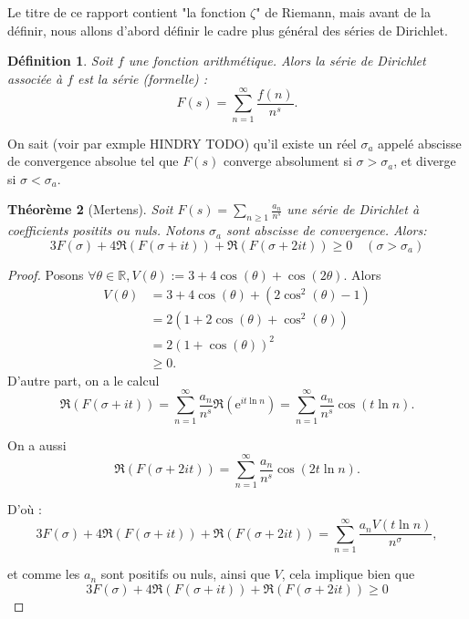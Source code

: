 \documentclass[french]{report}
\newtheorem{theorem}{Théorème}[section]
\newtheorem{definition}[theorem]{Définition}
\begin{document}
Le titre de ce rapport contient "la fonction $\zeta$" de Riemann, mais avant de la définir, nous allons d'abord définir le cadre plus général des séries de Dirichlet.

\begin{definition}\label{def:serie-dirichlet}
  Soit $f$ une fonction arithmétique. Alors la série de Dirichlet associée à $f$ est la série (formelle) :
  \[ F(s) = \sum_{n=1}^\infty\frac{f(n)}{n^s}. \]
\end{definition}

On sait (voir par exmple HINDRY TODO) qu'il existe un réel $\sigma_a$ appelé abscisse de convergence absolue tel que $F(s)$ converge absolument si $\sigma>\sigma_a$, et diverge si $\sigma<\sigma_a$.

\begin{theorem}[Mertens]\label{thm:mertens-positif}
  Soit $F(s) =\sum_{n\geq1}\frac{a_n}{n^s}$ une série de Dirichlet à coefficients positits ou nuls. Notons $\sigma_a$ sont abscisse de convergence. Alors:
  \[ 3F(\sigma)+4\Re(F(\sigma+it))+\Re(F(\sigma+2it))\geq0 \quad(\sigma>\sigma_a) \]
\end{theorem}

\begin{proof}
  Posons $\forall\theta\in\mathbb{R}, V(\theta) := 3+4\cos(\theta)+\cos(2\theta)$. Alors
  \begin{align*}
    V(\theta) &= 3+4\cos(\theta)+(2\cos^2(\theta)-1) \\
              &= 2(1+2\cos(\theta)+\cos^2(\theta)) \\
              &= 2(1+\cos(\theta))^2 \\
              &\geq0.
  \end{align*}
  D'autre part, on a le calcul
  \[
    \Re(F(\sigma+it))
    =\sum_{n=1}^\infty\frac{a_n}{n^s}\Re(\mathrm{e}^{it\ln n})
    =\sum_{n=1}^\infty\frac{a_n}{n^s}\cos(t\ln n).
  \]

  On a aussi
  \[
    \Re(F(\sigma+2it))
    = \sum_{n=1}^\infty\frac{a_n}{n^s}\cos(2t\ln n).
  \]

  D'où :
  \[
    3F(\sigma)+4\Re(F(\sigma+it))+\Re(F(\sigma+2it))
    = \sum_{n=1}^\infty\frac{a_n V(t\ln n)}{n^\sigma},
  \]

  et comme les $a_n$ sont positifs ou nuls, ainsi que $V$, cela implique bien que
  \[ 3F(\sigma)+4\Re(F(\sigma+it))+\Re(F(\sigma+2it))\geq0 \]
  
\end{proof}

\end{document}
